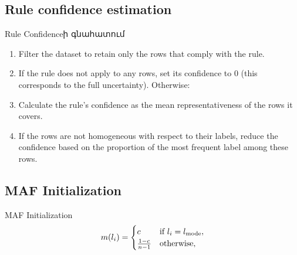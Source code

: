\documentclass[aspectratio=169]{beamer}
\begin{document}
\subsection{Rule confidence estimation}
\begin{frame}{Rule Confidenceի գնահատում}

\begin{enumerate}
    \item Filter the dataset to retain only the rows that comply with the rule. \pause
    \item If the rule does not apply to any rows, set its confidence to 0 (this corresponds
to the full uncertainty). Otherwise: \pause
    \item Calculate the rule’s confidence as the mean representativeness of the rows it
covers. \pause
    \item If the rows are not homogeneous with respect to their labels, reduce the
confidence based on the proportion of the most frequent label among these
rows.
\end{enumerate} 
\end{frame}




\subsection{MAF Initialization}
\begin{frame}{MAF Initialization}
\[
m(l_i) = 
\begin{cases} 
c & \text{if } l_i = l_{\text{{\rm mode}}}, \\
\frac{1-c}{n-1} & \text{otherwise},
\end{cases}
\]


\end{frame}
\end{document}
